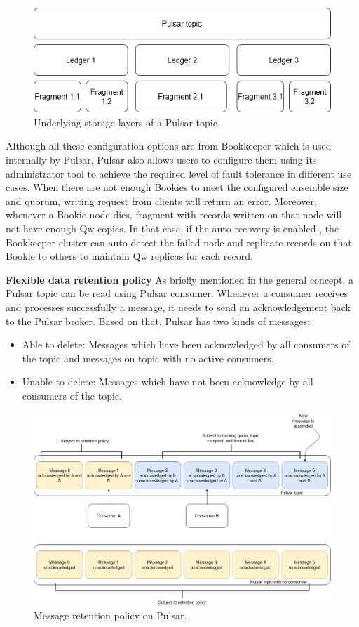 \begin{figure}[h]
	\centering
	\includegraphics[width=12.5cm]{images/pulsar-topic.png}
	\caption{Underlying storage layers of a Pulsar topic.}
	\label{fig:pulsartopic}
\end{figure}
Although all these configuration options are from Bookkeeper which is used internally by Pulsar, Pulsar also allows users to configure them using its administrator tool to achieve the required level of fault tolerance in different use cases. When there are not enough Bookies to meet the configured ensemble size and quorum, writing request from clients will return an error. Moreover, whenever a Bookie node dies, fragment with records written on that node will not have enough Qw copies. In that case, if the auto recovery is enabled \cite{bookkeeperadmin}, the Bookkeeper cluster can auto detect the failed node and replicate records on that Bookie to others to maintain Qw replicas for each record.  

\textbf{Flexible data retention policy}
As briefly mentioned in the general concept, a Pulsar topic can be read using Pulsar consumer. Whenever a consumer receives and processes successfully a message, it needs to send an acknowledgement back to the Pulsar broker. Based on that, Pulsar has two kinds of messages:
\begin{itemize}
	\item Able to delete: Messages which have been acknowledged by all consumers of the topic and messages on topic with no active consumers.
	\item Unable to delete: Messages which have not been acknowledge by all consumers of the topic.
\end{itemize}

\begin{figure}[h]
	\centering
	\includegraphics[width=\linewidth]{images/pulsar-retention.png}
	\caption{Message retention policy on Pulsar.}
	\label{fig:pulsarretention}
\end{figure}

